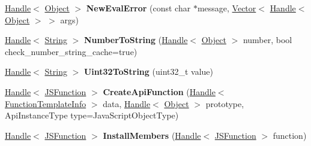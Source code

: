 \begin{DoxyCompactItemize}
\item 
\hypertarget{classv8_1_1internal_1_1_v8___f_i_n_a_l_a7a4aee983a0cbe91061631528d2d8e20}{}\hyperlink{classv8_1_1internal_1_1_handle}{Handle}$<$ \hyperlink{classv8_1_1internal_1_1_object}{Object} $>$ {\bfseries New\+Eval\+Error} (const char $\ast$message, \hyperlink{classv8_1_1internal_1_1_vector}{Vector}$<$ \hyperlink{classv8_1_1internal_1_1_handle}{Handle}$<$ \hyperlink{classv8_1_1internal_1_1_object}{Object} $>$ $>$ args)\label{classv8_1_1internal_1_1_v8___f_i_n_a_l_a7a4aee983a0cbe91061631528d2d8e20}

\item 
\hypertarget{classv8_1_1internal_1_1_v8___f_i_n_a_l_a0034d59cf48a6020508b0a55e9375788}{}\hyperlink{classv8_1_1internal_1_1_handle}{Handle}$<$ \hyperlink{classv8_1_1internal_1_1_string}{String} $>$ {\bfseries Number\+To\+String} (\hyperlink{classv8_1_1internal_1_1_handle}{Handle}$<$ \hyperlink{classv8_1_1internal_1_1_object}{Object} $>$ number, bool check\+\_\+number\+\_\+string\+\_\+cache=true)\label{classv8_1_1internal_1_1_v8___f_i_n_a_l_a0034d59cf48a6020508b0a55e9375788}

\item 
\hypertarget{classv8_1_1internal_1_1_v8___f_i_n_a_l_afc8f8eb2f8b9e3f781fcc2c258c43e35}{}\hyperlink{classv8_1_1internal_1_1_handle}{Handle}$<$ \hyperlink{classv8_1_1internal_1_1_string}{String} $>$ {\bfseries Uint32\+To\+String} (uint32\+\_\+t value)\label{classv8_1_1internal_1_1_v8___f_i_n_a_l_afc8f8eb2f8b9e3f781fcc2c258c43e35}

\item 
\hypertarget{classv8_1_1internal_1_1_v8___f_i_n_a_l_a14dfa86e37846ec6d3a34754ff33634d}{}\hyperlink{classv8_1_1internal_1_1_handle}{Handle}$<$ \hyperlink{classv8_1_1internal_1_1_j_s_function}{J\+S\+Function} $>$ {\bfseries Create\+Api\+Function} (\hyperlink{classv8_1_1internal_1_1_handle}{Handle}$<$ \hyperlink{classv8_1_1internal_1_1_function_template_info}{Function\+Template\+Info} $>$ data, \hyperlink{classv8_1_1internal_1_1_handle}{Handle}$<$ \hyperlink{classv8_1_1internal_1_1_object}{Object} $>$ prototype, Api\+Instance\+Type type=Java\+Script\+Object\+Type)\label{classv8_1_1internal_1_1_v8___f_i_n_a_l_a14dfa86e37846ec6d3a34754ff33634d}

\item 
\hypertarget{classv8_1_1internal_1_1_v8___f_i_n_a_l_ae742ecf431d71abd34353daf98c18678}{}\hyperlink{classv8_1_1internal_1_1_handle}{Handle}$<$ \hyperlink{classv8_1_1internal_1_1_j_s_function}{J\+S\+Function} $>$ {\bfseries Install\+Members} (\hyperlink{classv8_1_1internal_1_1_handle}{Handle}$<$ \hyperlink{classv8_1_1internal_1_1_j_s_function}{J\+S\+Function} $>$ function)\label{classv8_1_1internal_1_1_v8___f_i_n_a_l_ae742ecf431d71abd34353daf98c18678}


\end{DoxyCompactItemize}
